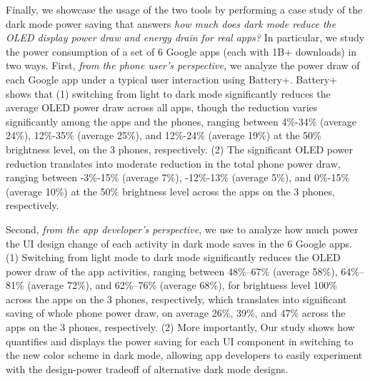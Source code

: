 
Finally, 
we showcase the usage of the two tools by performing a case study of the dark mode
power saving that answers {\em how much does dark mode reduce the
  OLED display power draw and energy drain for real apps?}  In
particular, we study the power consumption of a set of 6
 Google apps {(each with 1B+ downloads)} in two ways.  First, {\em from the phone user's
  perspective,} we analyze the power draw of each Google app under a
typical user interaction using Battery+.
Battery+ shows that (1) switching from light to dark mode
significantly reduces the average OLED power draw across all apps,
though the reduction varies significantly among the apps and the phones, ranging
between 4\%-34\% (average 24\%), 12\%-35\% (average 25\%), and
12\%-24\% (average 19\%) at the 50\% brightness level,
on the 3 phones, respectively.  (2) The significant OLED power reduction
translates into moderate reduction in the total phone power draw, ranging between
-3\%-15\% (average 7\%),
-12\%-13\% (average 5\%),
and 0\%-15\% (average 10\%) at the 50\% brightness level
across the apps on the 3 phones, respectively.

Second, {\em from the app developer's perspective}, we use \name to analyze how
much power the UI design change of each activity in dark mode saves in
the 6 Google apps.
(1) Switching from light mode to dark mode significantly reduces the OLED power
draw of the app activities, ranging between 48\%--67\% (average 58\%),
64\%--81\% (average 72\%), and 62\%--76\% (average 68\%),
for brightness level 100\% across the apps on the 3 phones, respectively,
which translates into significant saving of whole phone power draw,
on average 26\%, 39\%, and 47\% across the apps on the 3 phones, respectively.
(2) More importantly,
\fi
Our study shows how
\name quantifies and displays the power saving for each UI component
in switching to the new color scheme in dark mode, allowing app developers
to easily experiment with the design-power tradeoff of
alternative dark mode designs.


